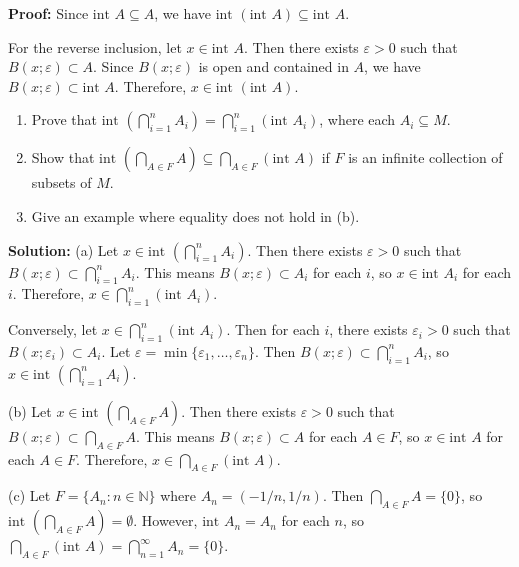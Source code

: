 \textbf{Proof:} Since $\text{int } A \subseteq A$, we have $\text{int }(\text{int } A) \subseteq \text{int } A$.

For the reverse inclusion, let $x \in \text{int } A$. Then there exists $\varepsilon > 0$ such that $B(x;\varepsilon) \subset A$. Since $B(x;\varepsilon)$ is open and contained in $A$, we have $B(x;\varepsilon) \subset \text{int } A$. Therefore, $x \in \text{int }(\text{int } A)$.

\begin{problembox}
\begin{enumerate}[label=\alph*)]
\item Prove that \(\text{int } \left(\bigcap_{i=1}^n A_i\right) = \bigcap_{i=1}^n (\text{int } A_i)\), where each \( A_i \subseteq M \).
\item Show that \(\text{int } \left(\bigcap_{A \in F} A\right) \subseteq \bigcap_{A \in F} (\text{int } A)\) if \( F \) is an infinite collection of subsets of \( M \).
\item Give an example where equality does not hold in (b).
\end{enumerate}
\end{problembox}

\textbf{Solution:} 
(a) Let $x \in \text{int }(\bigcap_{i=1}^n A_i)$. Then there exists $\varepsilon > 0$ such that $B(x;\varepsilon) \subset \bigcap_{i=1}^n A_i$. This means $B(x;\varepsilon) \subset A_i$ for each $i$, so $x \in \text{int } A_i$ for each $i$. Therefore, $x \in \bigcap_{i=1}^n (\text{int } A_i)$.

Conversely, let $x \in \bigcap_{i=1}^n (\text{int } A_i)$. Then for each $i$, there exists $\varepsilon_i > 0$ such that $B(x;\varepsilon_i) \subset A_i$. Let $\varepsilon = \min\{\varepsilon_1, \ldots, \varepsilon_n\}$. Then $B(x;\varepsilon) \subset \bigcap_{i=1}^n A_i$, so $x \in \text{int }(\bigcap_{i=1}^n A_i)$.

(b) Let $x \in \text{int }(\bigcap_{A \in F} A)$. Then there exists $\varepsilon > 0$ such that $B(x;\varepsilon) \subset \bigcap_{A \in F} A$. This means $B(x;\varepsilon) \subset A$ for each $A \in F$, so $x \in \text{int } A$ for each $A \in F$. Therefore, $x \in \bigcap_{A \in F} (\text{int } A)$.

(c) Let $F = \{A_n : n \in \mathbb{N}\}$ where $A_n = (-1/n, 1/n)$. Then $\bigcap_{A \in F} A = \{0\}$, so $\text{int }(\bigcap_{A \in F} A) = \emptyset$. However, $\text{int } A_n = A_n$ for each $n$, so $\bigcap_{A \in F} (\text{int } A) = \bigcap_{n=1}^{\infty} A_n = \{0\}$.

